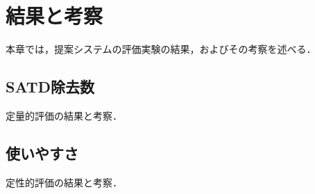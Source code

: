 \chapter{結果と考察}
本章では，提案システムの評価実験の結果，およびその考察を述べる．

\section{SATD除去数}
定量的評価の結果と考察．

\section{使いやすさ}
定性的評価の結果と考察．
